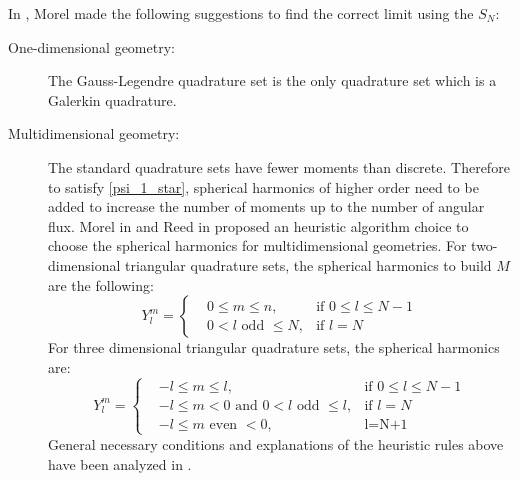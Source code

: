 In \cite{galerkin_morel}, Morel made the following suggestions to find the 
correct limit using the $S_N$:
\begin{description}
\item [One-dimensional geometry:] The Gauss-Legendre quadrature set is the
  only quadrature set which is a Galerkin quadrature.
\item [Multidimensional geometry:] The standard quadrature sets have fewer 
  moments than discrete. Therefore to satisfy \cref{psi_1_star}, spherical
  harmonics of higher order need to be added to increase the number of moments
  up to the number of angular flux. Morel in \cite{galerkin_morel} and Reed in 
  \cite{reed} proposed an heuristic algorithm choice to choose the spherical 
  harmonics for multidimensional geometries. For two-dimensional triangular 
  quadrature sets, the spherical harmonics to build $M$ are the following:
  \begin{equation}
    Y_l^m = \left\{
      \begin{aligned}
        &0\leq m \leq n, & \textrm{if }0\leq l\leq N-1 \\
        &0< l\textrm{ odd }\leq N, & \textrm{if }l=N
      \end{aligned}
      \right.
  \end{equation}
  For three dimensional triangular quadrature sets, the spherical harmonics
  are:
  \begin{equation}
    Y_l^m = \left\{
      \begin{aligned}
        &-l\leq m \leq l, & \textrm{if }0\leq l \leq N-1\\
        &-l\leq m <0 \textrm{ and } 0<l\textrm{ odd }\leq l, & \textrm{if }l=N\\
        &-l\leq m\textrm{ even }<0,& \textrm{l=N+1}
      \end{aligned}
      \right.
  \end{equation}
  General necessary conditions and explanations of the heuristic rules above
  have been analyzed in \cite{galerkin_sanchez}.
\end{description}

